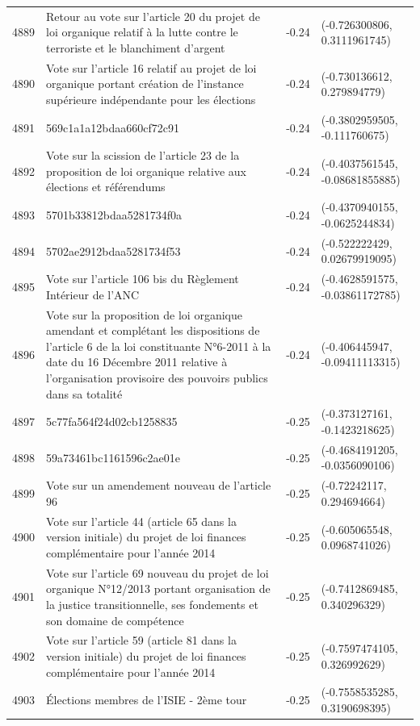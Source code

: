 \begin{table}[ht]
\begin{tabular}{rlrl}
  4889 & Retour au vote sur l'article 20 du projet de loi organique relatif à la lutte contre le terroriste et le blanchiment d'argent & -0.24 & (-0.726300806, 0.3111961745) \\ 
  4890 & Vote sur l'article 16 relatif au projet de loi organique portant création de l'instance supérieure indépendante pour les élections & -0.24 & (-0.730136612, 0.279894779) \\ 
  4891 & 569c1a1a12bdaa660cf72c91 & -0.24 & (-0.3802959505, -0.111760675) \\ 
  4892 & Vote sur la scission de l'article 23 de la proposition de loi organique relative aux élections et référendums & -0.24 & (-0.4037561545, -0.08681855885) \\ 
  4893 & 5701b33812bdaa5281734f0a & -0.24 & (-0.4370940155, -0.0625244834) \\ 
  4894 & 5702ae2912bdaa5281734f53 & -0.24 & (-0.522222429, 0.02679919095) \\ 
  4895 & Vote sur l'article 106 bis du Règlement Intérieur de l'ANC & -0.24 & (-0.4628591575, -0.03861172785) \\ 
  4896 & Vote sur la proposition de loi organique amendant et complétant les dispositions de l'article 6 de la loi constituante N°6-2011 à la date du 16 Décembre 2011 relative à l'organisation provisoire des pouvoirs publics dans sa totalité & -0.24 & (-0.406445947, -0.09411113315) \\ 
  4897 & 5c77fa564f24d02cb1258835 & -0.25 & (-0.373127161, -0.1423218625) \\ 
  4898 & 59a73461bc1161596c2ae01e & -0.25 & (-0.4684191205, -0.0356090106) \\ 
  4899 & Vote sur un amendement nouveau de l'article 96 & -0.25 & (-0.72242117, 0.294694664) \\ 
  4900 & Vote sur l'article 44 (article 65 dans la version initiale) du projet de loi finances complémentaire pour l'année 2014 & -0.25 & (-0.605065548, 0.0968741026) \\ 
  4901 & Vote sur l'article 69 nouveau du projet de loi organique N°12/2013 portant organisation de la justice transitionnelle, ses fondements et son domaine de compétence & -0.25 & (-0.7412869485, 0.340296329) \\ 
  4902 & Vote sur l'article 59 (article 81 dans la version initiale) du projet de loi finances complémentaire pour l'année 2014 & -0.25 & (-0.7597474105, 0.326992629) \\ 
  4903 & Élections membres de l'ISIE - 2ème tour & -0.25 & (-0.7558535285, 0.3190698395) \\ 

\end{tabular}
\end{table}
